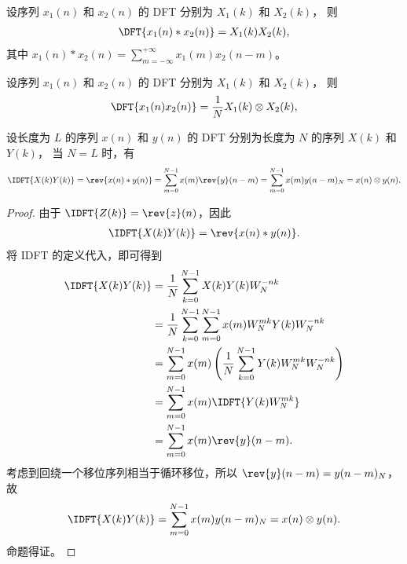 \begin{property}
    设序列 $x_1(n)$ 和 $x_2(n)$ 的 DFT 分别为 $X_1(k)$ 和 $X_2(k)$，
    则
    \begin{align*}
        \DFT{x_1(n) * x_2(n)} = X_1(k)X_2(k),
    \end{align*}
    其中 $x_1(n) * x_2(n) = \sum_{m = -\infty}^{+\infty}x_1(m)x_2(n - m)$。
\end{property}

\begin{property}
    设序列 $x_1(n)$ 和 $x_2(n)$ 的 DFT 分别为 $X_1(k)$ 和 $X_2(k)$，
    则
    \begin{align*}
        \DFT{x_1(n)x_2(n)} = \frac{1}{N}X_1(k) \otimes X_2(k),
    \end{align*}
\end{property}

\begin{property}
    设长度为 $L$ 的序列 $x(n)$ 和 $y(n)$ 的 DFT 分别为长度为 $N$ 的序列 $X(k)$ 和 $Y(k)$，
    当 $N = L$ 时，有
    \begin{align*}
        \IDFT{X(k)Y(k)} = \rev{x(n) * y(n)}
        = \sum_{m = 0}^{N - 1}x(m)\rev{y}(n - m)
        = \sum_{m = 0}^{N - 1}x(m)y(n - m)_N = x(n) \otimes y(n).
    \end{align*}
\end{property}

\begin{proof}
    由于 $\IDFT{Z(k)} = \rev{z}(n)$，因此
    \begin{align*}
        \IDFT{X(k)Y(k)} = \rev{x(n) * y(n)}.
    \end{align*}
    将 IDFT 的定义代入，即可得到
    \begin{align*}
        \IDFT{X(k)Y(k)} & = \frac{1}{N}\sum_{k = 0}^{N - 1}X(k)Y(k)W_N^{-nk} \\
        & = \frac{1}{N}\sum_{k = 0}^{N - 1}\sum_{m = 0}^{N - 1}x(m)W_N^{mk}Y(k)W_N^{-nk} \\
        & = \sum_{m = 0}^{N - 1}x(m)\left(\frac{1}{N}\sum_{k = 0}^{N - 1}Y(k)W_N^{mk}W_N^{-nk}\right) \\
        & = \sum_{m = 0}^{N - 1}x(m)\IDFT{Y(k)W_N^{mk}} \\
        & = \sum_{m = 0}^{N - 1}x(m)\rev{y}(n - m).
    \end{align*}
    考虑到回绕一个移位序列相当于循环移位，所以 $\rev{y}(n - m) = y(n - m)_N$，故
    \begin{align*}
        \IDFT{X(k)Y(k)} = \sum_{m = 0}^{N - 1}x(m)y(n - m)_N = x(n) \otimes y(n).
    \end{align*}
    命题得证。
\end{proof}

